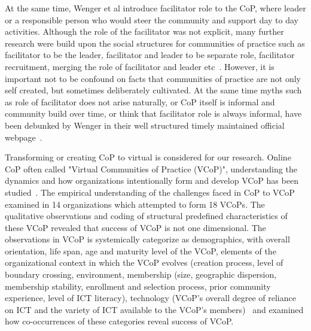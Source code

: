 \documentclass[format=acmsmall, review=false, screen=true]{acmart}
\begin{document}
At the same time, Wenger et al introduce facilitator role to the CoP, where leader or a responsible person who would steer the community and support day to day activities. Although the role of the facilitator was not explicit, many further research were build upon the social structures for communities of practice such as facilitator to be the leader, facilitator and leader to be separate role, facilitator recruitment, merging the role of facilitator and leader etc~\cite{tarmizi2005facilitation}. However, it is important not to be confound on facts that communities of practice are not only self created, but sometimes deliberately cultivated. At the same time myths such as role of facilitator does not arise naturally, or CoP itself is informal and community build over time, or think that facilitator role is always informal, have been debunked by Wenger in their well structured timely maintained official webpage~\cite{Wenger@site}. 


Transforming or creating CoP to virtual is considered for our research. Online CoP often called "Virtual Communities of Practice (VCoP)", understanding the dynamics and how organizations
intentionally form and develop VCoP has been studied~\cite{dube2005impact}. The empirical understanding of the challenges faced in CoP to VCoP examined in 14 organizations which attempted to form 18 VCoPs. The qualitative observations and coding of structural predefined characteristics of these VCoP revealed that success of VCoP is not one dimensional. The observations in VCoP is systemically categorize as demographics,
with overall orientation, life span, age and maturity level of the VCoP, elements of the organizational context in which the VCoP evolves (creation process, level of boundary crossing, environment, membership (size, geographic dispersion, membership stability,
enrollment and selection process, prior community experience, level of ICT literacy), technology (VCoP’s overall degree of reliance on ICT and the variety of ICT available to the VCoP’s members)~\cite{dube2003towards} and examined how co-occurrences of these categories reveal success of VCoP. 
\end{document}
